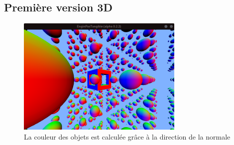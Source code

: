 \subsection{Première version 3D}
\begin{figure}[h]
    \centering
    \includegraphics[width=8cm]{images/screens/couleurnormale.png}
    \caption{La couleur des objets est calculée grâce à la direction de la normale}
    \label{fig:firstpreview}
\end{figure}